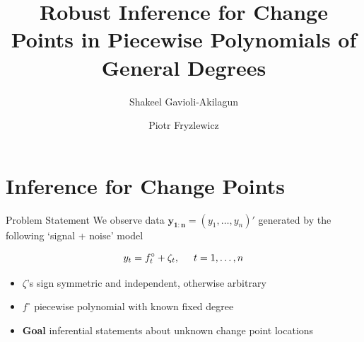 \documentclass{beamer}
\title[CSM 2021]{Robust Inference for Change Points in Piecewise Polynomials of General Degrees}
\author[]{Shakeel Gavioli-Akilagun \and Piotr Fryzlewicz}
\institute[LSE department of Statistics]{\scshape{London School of Economics \\ Department of Statistics}}
\date[December 2021]{}
\begin{document}
\begin{frame}
  \titlepage
\end{frame}

\logo{}

\section{Inference for Change Points}

\begin{frame}
\tableofcontents[currentsection]
\end{frame}

\begin{frame}{Problem Statement}
We observe data $\mathbf{y_{1:n}} = \left ( y_1, \dots, y_n \right )'$ generated by the following `signal + noise' model

\begin{equation*}
	y_t = f_t^\circ + \zeta_t, \hspace{0.5cm} t = 1, \dots, n
\end{equation*}

\hfill

\begin{itemize}
\item $\zeta$'s sign symmetric and independent, otherwise arbitrary
\item $f^\circ$ piecewise polynomial with known fixed degree
\item \textbf{Goal} inferential statements about unknown change point locations
\end{itemize}
\end{frame}
\end{document}
